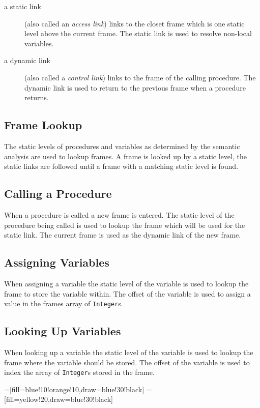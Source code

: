 \documentclass[a4paper,twoside,twocolumn]{article}
\begin{document}
\begin{description}
\item[a static link] (also called an \emph{access link}) links to the closet
frame which is one static level above the current frame. The static link
is used to resolve non-local variables.

\item[a dynamic link] (also called a \emph{control link}) links to the frame
of the calling procedure. The dynamic link is used to return to the previous
frame when a procedure returns.
\end{description}

\subsection{Frame Lookup}\label{section:lookup}
The static levels of procedures and variables as determined by the semantic
analysis are used to lookup frames. A frame is looked up by a static level,
the static links are followed until a frame with a matching static level is
found.

\subsection{Calling a Procedure}\label{section:call}
When a procedure is called a new frame is entered. The static level of the
procedure being called is used to lookup the frame which will be used for the
static link. The current frame is used as the dynamic link of the new frame.

\subsection{Assigning Variables}\label{section:assignment}
When assigning a variable the static level of the variable is used to lookup
the frame to store the variable within. The offset of the variable is used
to assign a value in the frames array of \texttt{Integer}s.

\subsection{Looking Up Variables}\label{section:lookup}
When looking up a variable the static level of the variable is used to lookup
the frame where the variable should be stored. The offset of the variable is
used to index the array of \texttt{Integer}s stored in the frame.

=[fill=blue!10!orange!10,draw=blue!30!black]
=[fill=yellow!20,draw=blue!30!black]
\end{document}
